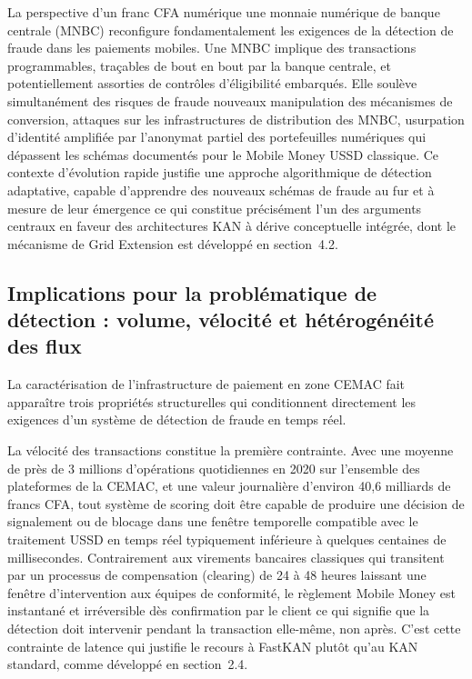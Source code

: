\documentclass[11pt,a4paper,oneside]{report}
\theoremstyle{definition}
\theoremstyle{remark}
\begin{document}
La perspective d'un franc CFA numérique  une monnaie numérique de banque centrale (MNBC)  reconfigure fondamentalement les exigences de la détection de fraude dans les paiements mobiles. Une MNBC implique des transactions programmables, traçables de bout en bout par la banque centrale, et potentiellement assorties de contrôles d'éligibilité embarqués. Elle soulève simultanément des risques de fraude nouveaux  manipulation des mécanismes de conversion, attaques sur les infrastructures de distribution des MNBC, usurpation d'identité amplifiée par l'anonymat partiel des portefeuilles numériques  qui dépassent les schémas documentés pour le Mobile Money USSD classique. Ce contexte d'évolution rapide justifie une approche algorithmique de détection adaptative, capable d'apprendre des nouveaux schémas de fraude au fur et à mesure de leur émergence  ce qui constitue précisément l'un des arguments centraux en faveur des architectures KAN à dérive conceptuelle intégrée, dont le mécanisme de Grid Extension est développé en section~4.2.

\subsection{Implications pour la problématique de détection : volume, vélocité et hétérogénéité des flux}

La caractérisation de l'infrastructure de paiement en zone CEMAC fait apparaître trois propriétés structurelles qui conditionnent directement les exigences d'un système de détection de fraude en temps réel.

La vélocité des transactions constitue la première contrainte. Avec une moyenne de près de 3 millions d'opérations quotidiennes en 2020 sur l'ensemble des plateformes de la CEMAC, et une valeur journalière d'environ 40,6 milliards de francs CFA, tout système de scoring doit être capable de produire une décision de signalement ou de blocage dans une fenêtre temporelle compatible avec le traitement USSD en temps réel  typiquement inférieure à quelques centaines de millisecondes. Contrairement aux virements bancaires classiques qui transitent par un processus de compensation (clearing) de 24 à 48 heures laissant une fenêtre d'intervention aux équipes de conformité, le règlement Mobile Money est instantané et irréversible dès confirmation par le client  ce qui signifie que la détection doit intervenir pendant la transaction elle-même, non après. C'est cette contrainte de latence qui justifie le recours à FastKAN plutôt qu'au KAN standard, comme développé en section~2.4.
\end{document}
